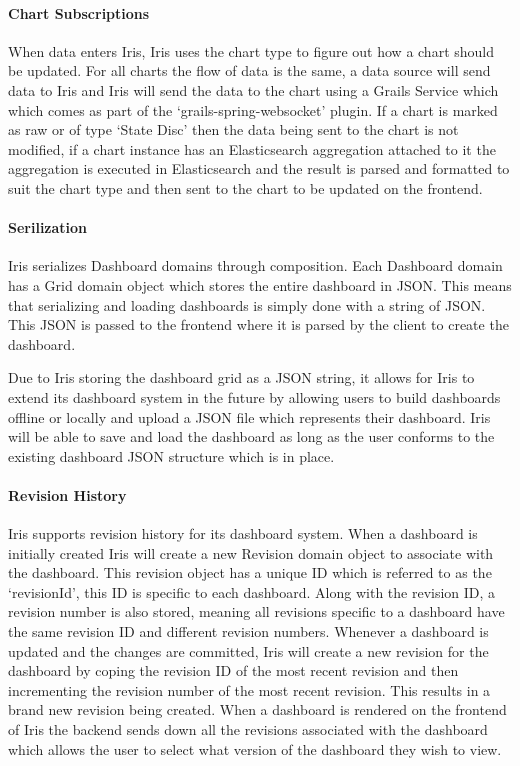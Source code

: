 \documentclass[12pt,a4paper,titlepage]{report}
\begin{document}
\paragraph{Chart Subscriptions}
When data enters Iris, Iris uses the chart type to figure out how a chart should be updated. For all charts the flow of data is the same, a data source will send data to Iris and Iris will send the data to the chart using a Grails Service which which comes as part of the `grails-spring-websocket' plugin. If a chart is marked as raw or of type `State Disc' then the data being sent to the chart is not modified, if a chart instance has an Elasticsearch aggregation attached to it the aggregation is executed in Elasticsearch and the result is parsed and formatted to suit the chart type and then sent to the chart to be updated on the frontend.

\paragraph{Serilization}
Iris serializes Dashboard domains through composition. Each Dashboard domain has a Grid domain object which stores the entire dashboard in JSON. This means that serializing and loading dashboards is simply done with a string of JSON. This JSON is passed to the frontend where it is parsed by the client to create the dashboard.

Due to Iris storing the dashboard grid as a JSON string, it allows for Iris to extend its dashboard system in the future by allowing users to build dashboards offline or locally and upload a JSON file which represents their dashboard. Iris will be able to save and load the dashboard as long as the user conforms to the existing dashboard JSON structure which is in place.

\paragraph{Revision History}
Iris supports revision history for its dashboard system. When a dashboard is initially created Iris will create a new Revision domain object to associate with the dashboard. This revision object has a unique ID which is referred to as the `revisionId', this ID is specific to each dashboard. Along with the revision ID, a revision number is also stored, meaning all revisions specific to a dashboard have the same revision ID and different revision numbers. Whenever a dashboard is updated and the changes are committed, Iris will create a new revision for the dashboard by coping the revision ID of the most recent revision and then incrementing the revision number of the most recent revision. This results in a brand new revision being created. When a dashboard is rendered on the frontend of Iris the backend sends down all the revisions associated with the dashboard which allows the user to select what version of the dashboard they wish to view.
\end{document}
